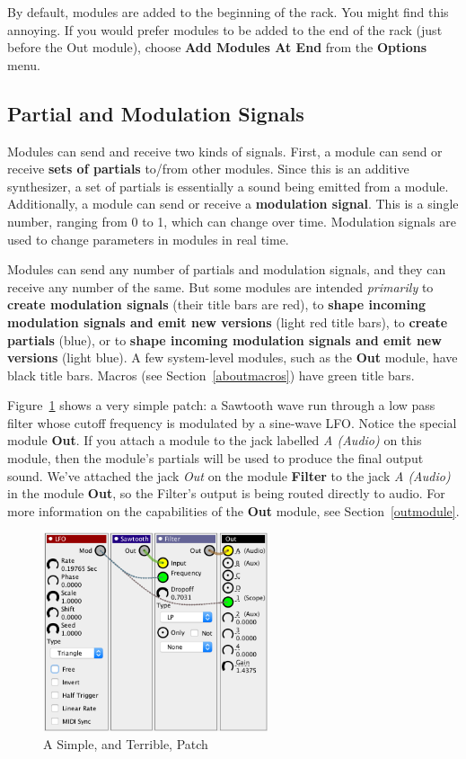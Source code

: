 \documentclass{article}
\begin{document}
By default, modules are added to the beginning of the rack.  You might find this annoying.  If you would prefer modules to be added to the end of the rack (just before the Out module), choose {\bf Add Modules At End} from the {\bf Options} menu.

\subsection{Partial and Modulation Signals}  Modules can send and receive two kinds of signals.  First, a module can send or receive {\bf sets of partials} to/from other modules.  Since this is an additive synthesizer, a set of partials is essentially a sound being emitted from a module.  Additionally, a module can send or receive a {\bf modulation signal}.  This is a single number, ranging from 0 to 1, which can change over time.  Modulation signals are used to change parameters in modules in real time.  

Modules can send any number of partials and modulation signals, and they can receive any number of the same.  But some modules are intended {\it primarily} to {\bf create modulation signals} (their title bars are red), to {\bf shape incoming modulation signals and emit new versions} (light red title bars), to {\bf create partials} (blue), or to {\bf shape incoming modulation signals and emit new versions} (light blue).  A few system-level modules, such as the {\bf Out} module, have black title bars.  Macros (see Section~\ref{aboutmacros}) have green title bars.

Figure~\ref{simplepatch} shows a very simple patch: a Sawtooth wave run through a low pass filter whose cutoff frequency is modulated by a sine-wave LFO.   Notice the special module {\bf Out}.  If you attach a module to the jack labelled {\it A (Audio)} on this module, then the module's partials will be used to produce the final output sound.  We've attached the jack {\it Out} on the module {\bf Filter} to the jack {\it A (Audio)} in the module {\bf Out}, so the Filter's output is being routed directly to audio.   For more information on the capabilities of the {\bf Out} module, see Section~\ref{outmodule}.

\begin{figure}
\includegraphics[width=2.6in]{simplepatch.png}
\caption{A Simple, and Terrible, Patch}
\vspace{-1em}
\label{simplepatch}
\end{figure}
\end{document}
